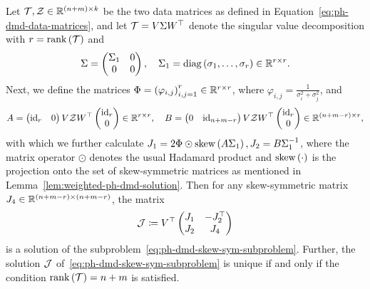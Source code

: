 \begin{theorem}
    Let $\mcl{T}, \mcl{Z} \in \bb{R}^{(n + m) \times k}$ be the two data matrices as defined in Equation~\eqref{eq:ph-dmd-data-matrices}, and let $\mcl{T} = V \Sigma W\trans$ denote the singular value decomposition with $r = \rank{\mcl{T}}$ and
    \begin{equation*}
        \Sigma = \begin{pmatrix}
            \Sigma_1 & 0 \\
            0 & 0
        \end{pmatrix},\quad \Sigma_1 = \diag{\sigma_1, \dots, \sigma_r} \in \bb{R}^{r \times r}.
    \end{equation*}
    Next, we define the matrices $\Phi = {(\varphi_{i, j})}_{i, j = 1}^r \in \bb{R}^{r \times r}$, where $\varphi_{i, j} = \frac{1}{\sigma_i^2 + \sigma_j^2}$, and
    \begin{equation*}
        A = \begin{pmatrix}
            \id[r] & 0
        \end{pmatrix} V \mcl{Z} W\trans \begin{pmatrix}
            \id[r] \\
            0
        \end{pmatrix} \in \bb{R}^{r \times r},\quad B = \begin{pmatrix}
            0 & \id[n + m - r]
        \end{pmatrix} V \mcl{Z} W\trans \begin{pmatrix}
            \id[r] \\
            0
        \end{pmatrix} \in \bb{R}^{(n + m - r) \times r},
    \end{equation*}
    with which we further calculate $J_1 = 2 \Phi \odot \sksym{A \Sigma_1}, J_2 = B \Sigma_1\inv$, where the matrix operator $\odot$ denotes the usual Hadamard product and $\sksym{\cdot}$ is the projection onto the set of skew-symmetric matrices as mentioned in Lemma~\ref{lem:weighted-ph-dmd-solution}.
    Then for any skew-symmetric matrix $J_4 \in \bb{R}^{(n + m - r) \times (n + m - r)}$, the matrix
    \begin{equation*}
        \mcl{J} \coloneqq V\trans \begin{pmatrix}
            J_1 & -J_2\trans \\
            J_2 & J_4
        \end{pmatrix}
    \end{equation*}
    is a solution of the subproblem~\eqref{eq:ph-dmd-skew-sym-subproblem}.
    Further, the solution $\mcl{J}$ of~\eqref{eq:ph-dmd-skew-sym-subproblem} is unique if and only if the condition $\rank{\mcl{T}} = n + m$ is satisfied.
\end{theorem}

